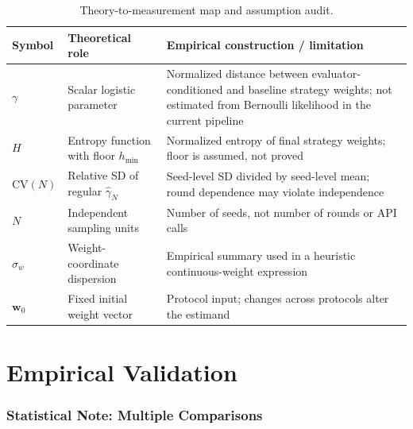 \documentclass[11pt]{article}
\begin{document}
\begin{table}[t]
\centering
\caption{Theory-to-measurement map and assumption audit.}
\label{tab:estimand-map}
\small
\begin{tabular}{@{}p{}p{}p{}@{}}
\toprule
Symbol & Theoretical role & Empirical construction / limitation \\
\midrule
$\gamma$ & Scalar logistic parameter & Normalized distance between evaluator-conditioned and baseline strategy weights; not estimated from Bernoulli likelihood in the current pipeline \\
$H$ & Entropy function with floor $h_{\min}$ & Normalized entropy of final strategy weights; floor is assumed, not proved \\
$\mathrm{CV}(N)$ & Relative SD of regular $\hat\gamma_N$ & Seed-level SD divided by seed-level mean; round dependence may violate independence \\
$N$ & Independent sampling units & Number of seeds, not number of rounds or API calls \\
$\sigma_w$ & Weight-coordinate dispersion & Empirical summary used in a heuristic continuous-weight expression \\
$\mathbf w_0$ & Fixed initial weight vector & Protocol input; changes across protocols alter the estimand \\
\bottomrule
\end{tabular}
\end{table}

\section{Empirical Validation}

\subsubsection*{Statistical Note: Multiple Comparisons}
\end{document}
